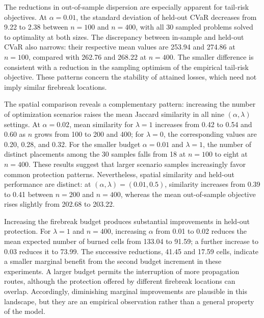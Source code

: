 \documentclass[a4paper,fleqn]{cas-sc}
\begin{document}
The reductions in out-of-sample dispersion are especially apparent
for tail-risk objectives. At $\alpha=0.01$, the standard deviation of
held-out CVaR decreases from 9.22 to 2.38 between $n=100$ and $n=400$,
with all 30 sampled problems solved to optimality at both sizes.
The discrepancy between in-sample and held-out CVaR also narrows:
their respective mean values are 253.94 and 274.86 at $n=100$,
compared with 262.76 and 268.22 at $n=400$. The smaller difference
is consistent with a reduction in the sampling optimism of the
empirical tail-risk objective. These patterns concern the stability
of attained losses, which need not imply similar firebreak locations.

The spatial comparison reveals a complementary pattern: increasing the
number of optimization scenarios raises the mean Jaccard similarity in
all nine $(\alpha,\lambda)$ settings. At $\alpha=0.02$, mean similarity
for $\lambda=1$ increases from 0.42 to 0.54 and 0.60 as $n$ grows
from 100 to 200 and 400; for $\lambda=0$, the corresponding values
are 0.20, 0.28, and 0.32. For the smaller budget $\alpha=0.01$ and
$\lambda=1$, the number of distinct placements among the 30 samples
falls from 18 at $n=100$ to eight at $n=400$. These results suggest
that larger scenario samples increasingly favor common protection
patterns. Nevertheless, spatial similarity and held-out performance
are distinct: at $(\alpha,\lambda)=(0.01,0.5)$, similarity increases
from 0.39 to 0.41 between $n=200$ and $n=400$, whereas the mean
out-of-sample objective rises slightly from 202.68 to 203.22.

Increasing the firebreak budget produces substantial improvements in
held-out protection. For $\lambda=1$ and $n=400$, increasing
$\alpha$ from 0.01 to 0.02 reduces the mean expected number of burned
cells from 133.04 to 91.59; a further increase to 0.03 reduces it to
73.99. The successive reductions, 41.45 and 17.59 cells, indicate a
smaller marginal benefit from the second budget increment in these
experiments. A larger budget permits the interruption of more
propagation routes, although the protection offered by different
firebreak locations can overlap. Accordingly, diminishing marginal
improvements are plausible in this landscape, but they are an
empirical observation rather than a general property of the model.
\end{document}
